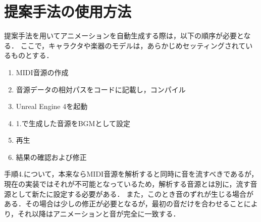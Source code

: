\section{提案手法の使用方法} \label{sec:howto}
提案手法を用いてアニメーションを自動生成する際は，以下の順序が必要となる．
ここで，キャラクタや楽器のモデルは，あらかじめセッティングされているものとする．
\begin{enumerate}
	\item MIDI音源の作成
	\item 音源データの相対パスをコードに記載し，コンパイル
	\item Unreal Engine 4を起動
	\item 1.で生成した音源をBGMとして設定
	\item 再生
	\item 結果の確認および修正
\end{enumerate}\par
手順4.について，本来ならMIDI音源を解析すると同時に音を流すべきであるが，現在の実装ではそれが不可能となっているため，解析する音源とは別に，流す音源として新たに設定する必要がある．
また，このとき音のずれが生じる場合がある．その場合は少しの修正が必要となるが，最初の音だけを合わせることにより，それ以降はアニメーションと音が完全に一致する．